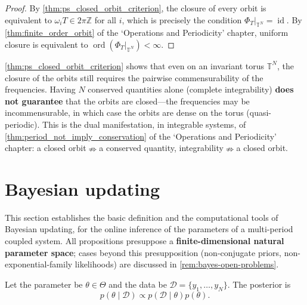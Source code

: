 \begin{proof}
By \cref{thm:ps_closed_orbit_criterion}, the closure of every orbit is equivalent to $\omega_i T\in 2\pi\mathbb{Z}$ for all $i$, which is precisely the condition $\Phi_T|_{\mathbb{T}^N} = \operatorname{id}$. By \cref{thm:finite_order_orbit} of the `Operations and Periodicity' chapter, uniform closure is equivalent to $\operatorname{ord}(\Phi_T|_{\mathbb{T}^N})<\infty$.
\end{proof}

\begin{remark}\label{rem:ps_conservation_not_sufficient}
\cref{thm:ps_closed_orbit_criterion} shows that even on an invariant torus $\mathbb{T}^N$, the closure of the orbits still requires the pairwise commensurability of the frequencies. Having $N$ conserved quantities alone (complete integrability) \textbf{does not guarantee} that the orbits are closed---the frequencies may be incommensurable, in which case the orbits are dense on the torus (quasi-periodic). This is the dual manifestation, in integrable systems, of \cref{thm:period_not_imply_conservation} of the `Operations and Periodicity' chapter: a closed orbit$\nRightarrow$a conserved quantity, integrability$\nRightarrow$a closed orbit.
\end{remark}

\section{Bayesian updating}\label{sec:ps_bayes_update}

\begin{remark}\label{rem:bayes-positioning}
This section establishes the basic definition and the computational tools of Bayesian updating, for the online inference of the parameters of a multi-period coupled system. All propositions presuppose a \textbf{finite-dimensional natural parameter space}; cases beyond this presupposition (non-conjugate priors, non-exponential-family likelihoods) are discussed in \cref{rem:bayes-open-problems}.
\end{remark}

\begin{definition}\label{def:bayes-update}
Let the parameter be $\theta\in\Theta$ and the data be $\mathcal{D}=\{y_1,\dots,y_N\}$. The posterior is
\[
p(\theta\mid\mathcal{D})\propto p(\mathcal{D}\mid\theta)p(\theta).
\]
\end{definition}

